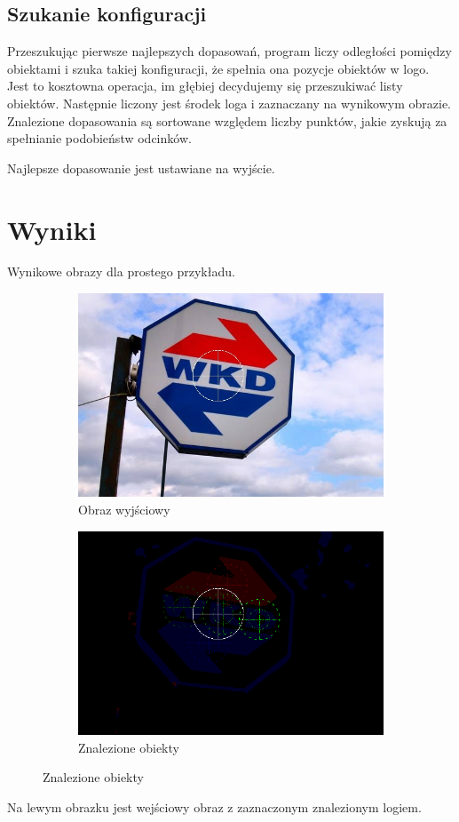 \documentclass[a4paper,12pt]{article}
\begin{document}
		\subsection{Szukanie konfiguracji}
			Przeszukując pierwsze \bestobjectscomparisondepth{} najlepszych dopasowań, program liczy odległości pomiędzy obiektami i szuka takiej konfiguracji, że spełnia ona pozycje obiektów w logo.
			Jest to kosztowna operacja, im głębiej decydujemy się przeszukiwać listy obiektów.
			Następnie liczony jest środek loga i zaznaczany na wynikowym obrazie.
			Znalezione dopasowania są sortowane względem liczby punktów, jakie zyskują za spełnianie podobieństw odcinków.
			
			Najlepsze dopasowanie jest ustawiane na wyjście.
			
	\section{Wyniki}
		Wynikowe obrazy dla prostego przykładu.
		\begin{figure}[h!]
			\centering
				\begin{subfigure}[b]{0.45\linewidth}
					\includegraphics[width=\linewidth]{raw.jpg}
					\caption{Obraz wyjściowy}
				\end{subfigure}
				\begin{subfigure}[b]{0.45\linewidth}
					\includegraphics[width=\linewidth]{output.png}
					\caption{Znalezione obiekty}
				\end{subfigure}
		\end{figure}
		Na lewym obrazku jest wejściowy obraz z zaznaczonym znalezionym logiem.
		
\end{document}
